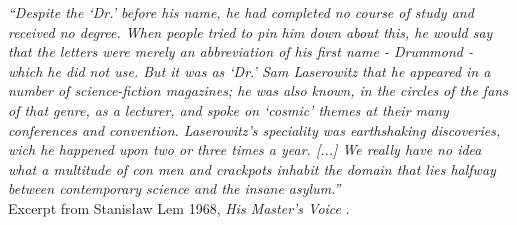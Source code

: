 \newpage

\vspace*{5cm}



\textit{``Despite the `Dr.' before his name, he had completed no course of study and received no degree. When people tried to pin him down about this, he would say that the letters were merely an abbreviation of his first name - Drummond - which he did not use. But it was as `Dr.' Sam Laserowitz that he appeared in a number of science-fiction magazines; he was also known, in the circles of the fans of that genre, as a lecturer, and spoke on `cosmic' themes at their many conferences and convention. Laserowitz's speciality was earthshaking discoveries, wich he happened upon two or three times a year. [...] We really have no idea what a multitude of con men and crackpots inhabit the domain that lies halfway between contemporary science and the insane asylum.''}\\

\noindent Excerpt from Stanis\l aw Lem 1968, \textit{His Master's Voice} \citep[p.~38]{Lem1984}.



\vspace{1cm}

